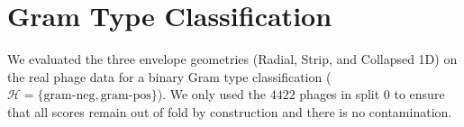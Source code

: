 





\section{Gram Type Classification}
\label{sec5.2: gram results}
We evaluated the three envelope geometries (Radial, Strip, and Collapsed 1D) on the real phage data for a binary 
Gram type classification ($\mathcal{H} = \{\text{gram-neg}, \text{gram-pos}\}$). We only used the 
$4422$ phages in split 0 to ensure that all scores remain out of fold by construction and there is no contamination.


